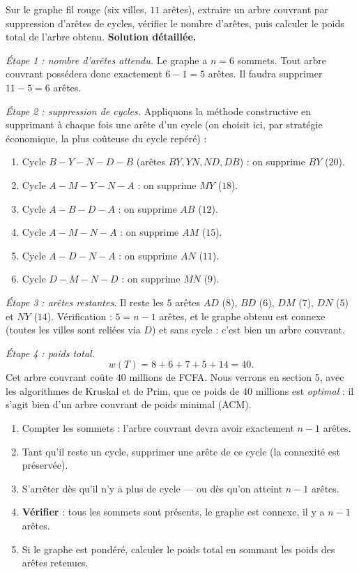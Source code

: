 \documentclass[11pt]{article}
\begin{document}
\begin{exoresolu}
Sur le graphe fil rouge (six villes, $11$ arêtes), extraire un arbre couvrant par suppression d'arêtes de cycles, vérifier le nombre d'arêtes, puis calculer le poids total de l'arbre obtenu.
\tcblower
\textbf{Solution détaillée.}

\emph{Étape 1 : nombre d'arêtes attendu.} Le graphe a $n = 6$ sommets. Tout arbre couvrant possédera donc exactement $6 - 1 = 5$ arêtes. Il faudra supprimer $11 - 5 = 6$ arêtes.

\emph{Étape 2 : suppression de cycles.} Appliquons la méthode constructive en supprimant à chaque fois une arête d'un cycle (on choisit ici, par stratégie économique, la plus coûteuse du cycle repéré) :
\begin{enumerate}
\item Cycle $B - Y - N - D - B$ (arêtes $BY, YN, ND, DB$) : on supprime $BY$ ($20$).
\item Cycle $A - M - Y - N - A$ : on supprime $MY$ ($18$).
\item Cycle $A - B - D - A$ : on supprime $AB$ ($12$).
\item Cycle $A - M - N - A$ : on supprime $AM$ ($15$).
\item Cycle $A - D - N - A$ : on supprime $AN$ ($11$).
\item Cycle $D - M - N - D$ : on supprime $MN$ ($9$).
\end{enumerate}

\emph{Étape 3 : arêtes restantes.} Il reste les $5$ arêtes $AD$ ($8$), $BD$ ($6$), $DM$ ($7$), $DN$ ($5$) et $NY$ ($14$). Vérification : $5 = n - 1$ arêtes, et le graphe obtenu est connexe (toutes les villes sont reliées via $D$) et sans cycle : c'est bien un arbre couvrant.

\emph{Étape 4 : poids total.}
\[ w(T) = 8 + 6 + 7 + 5 + 14 = 40. \]
Cet arbre couvrant coûte $40$ millions de FCFA. Nous verrons en section 5, avec les algorithmes de Kruskal et de Prim, que ce poids de $40$ millions est \emph{optimal} : il s'agit bien d'un arbre couvrant de poids minimal (ACM).
\end{exoresolu}

\begin{methode}
\begin{enumerate}
\item Compter les sommets : l'arbre couvrant devra avoir exactement $n - 1$ arêtes.
\item Tant qu'il reste un cycle, supprimer une arête de ce cycle (la connexité est préservée).
\item S'arrêter dès qu'il n'y a plus de cycle — ou dès qu'on atteint $n - 1$ arêtes.
\item \textbf{Vérifier} : tous les sommets sont présents, le graphe est connexe, il y a $n - 1$ arêtes.
\item Si le graphe est pondéré, calculer le poids total en sommant les poids des arêtes retenues.
\end{enumerate}
\end{methode}
\end{document}
